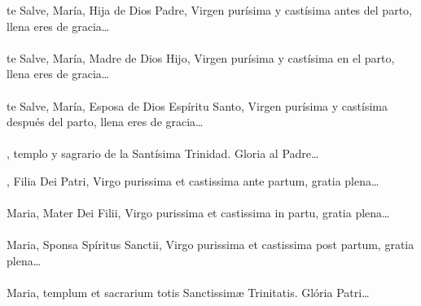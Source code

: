 \documentclass[./L00_main.tex]{subfiles}
\begin{document}
\bigskip

\label{final-prayer}
\begin{center}
\end{center}

\medskip

\begin{minipage}[t]{0.475\textwidth}
     te Salve, María, Hija de Dios Padre, Virgen purísima y castísima antes del parto, llena eres de gracia{\ldots}\\\\
    te Salve, María, Madre de Dios Hijo, Virgen purísima y castísima en el parto, llena eres de gracia{\ldots}\\\\
     te Salve, María, Esposa de Dios Espíritu Santo, Virgen purísima y castísima después del parto, llena eres de gracia{\ldots}\\\\
    , templo y sagrario de la Santísima Trinidad. Gloria al Padre{\ldots}
\end{minipage}
\begin{minipage}[t]{0.475\textwidth}
    , Filia Dei Patri, Virgo purissima et castissima ante partum, gratia plena{\ldots}\\\\
     Maria, Mater Dei Filii, Virgo purissima et castissima in partu, gratia plena{\ldots}\\\\
     Maria, Sponsa Spíritus Sanctii, Virgo purissima et castissima post partum, gratia plena{\ldots}\\\\
     Maria, templum et sacrarium totis Sanctissim{\ae} Trinitatis. Glória Patri{\ldots}
\end{minipage}

\bigskip\medskip


\begin{center}
\end{center}
\end{document}
